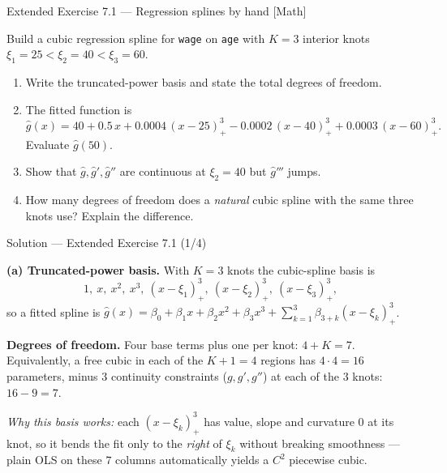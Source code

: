 \documentclass[aspectratio=169,11pt]{beamer}
\begin{document}
\begin{frame}{Extended Exercise 7.1 --- Regression splines by hand [Math]}
\begin{longexercise}
Build a cubic regression spline for \texttt{wage} on \texttt{age} with $K=3$ interior knots $\xi_1=25<\xi_2=40<\xi_3=60$.
\begin{enumerate}
  \item Write the truncated-power basis and state the total degrees of freedom.
  \item The fitted function is
  \[ \hat g(x)=40+0.5\,x+0.0004\,(x-25)^3_+ -0.0002\,(x-40)^3_+ +0.0003\,(x-60)^3_+ . \]
  Evaluate $\hat g(50)$.
  \item Show that $\hat g,\hat g',\hat g''$ are continuous at $\xi_2=40$ but $\hat g'''$ jumps.
  \item How many degrees of freedom does a \emph{natural} cubic spline with the same three knots use? Explain the difference.
\end{enumerate}
\end{longexercise}
\end{frame}

\begin{frame}{Solution --- Extended Exercise 7.1 (1/4)}
\begin{solutionbox}
\textbf{(a) Truncated-power basis.} With $K=3$ knots the cubic-spline basis is
\[ 1,\ x,\ x^2,\ x^3,\ (x-\xi_1)^3_+,\ (x-\xi_2)^3_+,\ (x-\xi_3)^3_+, \]
so a fitted spline is $\hat g(x)=\beta_0+\beta_1x+\beta_2x^2+\beta_3x^3+\sum_{k=1}^{3}\beta_{3+k}(x-\xi_k)^3_+$.

\medskip
\textbf{Degrees of freedom.} Four base terms plus one per knot: $4+K=7$. Equivalently, a free cubic in each of the $K+1=4$ regions has $4\cdot4=16$ parameters, minus $3$ continuity constraints ($g,g',g''$) at each of the $3$ knots: $16-9=7$.

\medskip
\emph{Why this basis works:} each $(x-\xi_k)^3_+$ has value, slope and curvature $0$ at its knot, so it bends the fit only to the \emph{right} of $\xi_k$ without breaking smoothness --- plain OLS on these $7$ columns automatically yields a $C^2$ piecewise cubic.
\end{solutionbox}
\end{frame}
\end{document}
